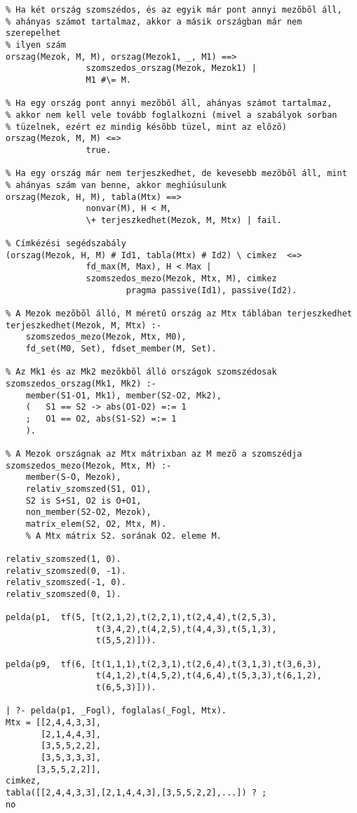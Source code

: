 \begin{verbatim}
% Ha két ország szomszédos, és az egyik már pont annyi mezõbõl áll,
% ahányas számot tartalmaz, akkor a másik országban már nem szerepelhet
% ilyen szám
orszag(Mezok, M, M), orszag(Mezok1, _, M1) ==>
                szomszedos_orszag(Mezok, Mezok1) |
                M1 #\= M.

% Ha egy ország pont annyi mezõbõl áll, ahányas számot tartalmaz,
% akkor nem kell vele tovább foglalkozni (mivel a szabályok sorban
% tüzelnek, ezért ez mindig késõbb tüzel, mint az elõzõ)
orszag(Mezok, M, M) <=> 
                true.

% Ha egy ország már nem terjeszkedhet, de kevesebb mezõbõl áll, mint
% ahányas szám van benne, akkor meghiúsulunk
orszag(Mezok, H, M), tabla(Mtx) ==>
                nonvar(M), H < M, 
                \+ terjeszkedhet(Mezok, M, Mtx) | fail.

% Címkézési segédszabály
(orszag(Mezok, H, M) # Id1, tabla(Mtx) # Id2) \ cimkez  <=>
                fd_max(M, Max), H < Max | 
                szomszedos_mezo(Mezok, Mtx, M), cimkez
                        pragma passive(Id1), passive(Id2).

% A Mezok mezõbõl álló, M méretû ország az Mtx táblában terjeszkedhet
terjeszkedhet(Mezok, M, Mtx) :-
    szomszedos_mezo(Mezok, Mtx, M0),
    fd_set(M0, Set), fdset_member(M, Set).

% Az Mk1 és az Mk2 mezõkbõl álló országok szomszédosak
szomszedos_orszag(Mk1, Mk2) :-
    member(S1-O1, Mk1), member(S2-O2, Mk2),
    (   S1 == S2 -> abs(O1-O2) =:= 1
    ;   O1 == O2, abs(S1-S2) =:= 1
    ).

% A Mezok országnak az Mtx mátrixban az M mezõ a szomszédja
szomszedos_mezo(Mezok, Mtx, M) :-
    member(S-O, Mezok),
    relativ_szomszed(S1, O1),
    S2 is S+S1, O2 is O+O1,
    non_member(S2-O2, Mezok),
    matrix_elem(S2, O2, Mtx, M).   
    % A Mtx mátrix S2. sorának O2. eleme M.

relativ_szomszed(1, 0).
relativ_szomszed(0, -1).
relativ_szomszed(-1, 0).
relativ_szomszed(0, 1).

pelda(p1,  tf(5, [t(2,1,2),t(2,2,1),t(2,4,4),t(2,5,3),
                  t(3,4,2),t(4,2,5),t(4,4,3),t(5,1,3),
                  t(5,5,2)])).                        

pelda(p9,  tf(6, [t(1,1,1),t(2,3,1),t(2,6,4),t(3,1,3),t(3,6,3),
                  t(4,1,2),t(4,5,2),t(4,6,4),t(5,3,3),t(6,1,2),
                  t(6,5,3)])).                                 

| ?- pelda(p1, _Fogl), foglalas(_Fogl, Mtx).
Mtx = [[2,4,4,3,3],
       [2,1,4,4,3],
       [3,5,5,2,2],
       [3,5,3,3,3],
      [3,5,5,2,2]],
cimkez,
tabla([[2,4,4,3,3],[2,1,4,4,3],[3,5,5,2,2],...]) ? ;
no
\end{verbatim}
